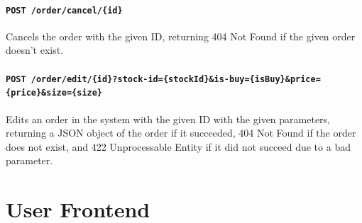 \documentclass{article}
\begin{document}
\paragraph{\texttt{POST /order/cancel/\{id\}}} Cancels the order with the given ID, returning 404 Not Found if the given order doesn't exist.

\paragraph{\texttt{POST /order/edit/\{id\}?stock-id=\{stockId\}\&is-buy=\{isBuy\}\&price=\{price\}\&size=\{size\}}} Edits an order in the system with the given ID with the given parameters, returning a JSON object of the order if it succeeded, 404 Not Found if the order does not exist, and 422 Unprocessable Entity if it did not succeed due to a bad parameter.

\section{User Frontend}
\end{document}
